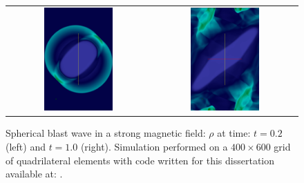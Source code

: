 \begin{figure}[htbp]\figSpace 
\begin{tabular}{cc}
\includegraphics[width=0.5\textwidth]{fig/blast_wave_mhd_0020.png} & 
\includegraphics[width=0.5\textwidth]{fig/blast_wave_mhd_0100.png} 
\end{tabular}
\caption{Spherical blast wave in a strong magnetic field: $\rho$ at time: $t=0.2$ (left) and $t=1.0$ (right).  Simulation performed on a $400 \times 600$ grid of quadrilateral elements with code written for this dissertation available at: \protect\gitrepo.}
\label{fig:blast_wave_mhd}
\figSpace
\end{figure}

